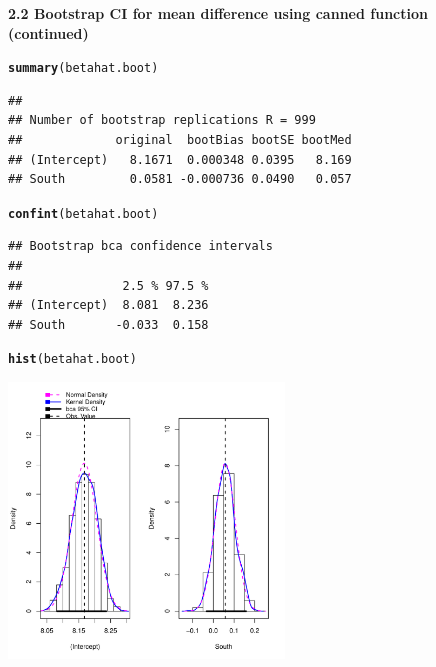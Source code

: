 \documentclass[10pt,handout]{beamer}\usepackage[]{graphicx}\usepackage[]{color}
\makeatletter
\newcommand{\hlstd}[1]{\textcolor[rgb]{0.345,0.345,0.345}{#1}}%
\newcommand{\hlkwd}[1]{\textcolor[rgb]{0.737,0.353,0.396}{\textbf{#1}}}%
\newenvironment{kframe}{%
 \def\at@end@of@kframe{}%
 \ifinner\ifhmode%
  \def\at@end@of@kframe{\end{minipage}}%
  \begin{minipage}{\columnwidth}%
 \fi\fi%
 \def\FrameCommand##1{\hskip\@totalleftmargin \hskip-\fboxsep
 \colorbox{shadecolor}{##1}\hskip-\fboxsep
     \hskip-\linewidth \hskip-\@totalleftmargin \hskip\columnwidth}%
 \MakeFramed {\advance\hsize-\width
   \@totalleftmargin\z@ \linewidth\hsize
   \@setminipage}}%
 {\par\unskip\endMakeFramed%
 \at@end@of@kframe}
\newenvironment{knitrout}{}{} %
\makeatother
\begin{document}
\begin{frame}[fragile,plain]
	\small
	\textbf{2.2 Bootstrap CI for mean difference using canned function (continued)}
\begin{knitrout}\tiny
{}\color{fgcolor}\begin{kframe}
\begin{alltt}
\hlkwd{summary}\hlstd{(betahat.boot)}
\end{alltt}
\begin{verbatim}
## 
## Number of bootstrap replications R = 999 
##             original  bootBias bootSE bootMed
## (Intercept)   8.1671  0.000348 0.0395   8.169
## South         0.0581 -0.000736 0.0490   0.057
\end{verbatim}
\begin{alltt}
\hlkwd{confint}\hlstd{(betahat.boot)}
\end{alltt}
\begin{verbatim}
## Bootstrap bca confidence intervals
## 
##              2.5 % 97.5 %
## (Intercept)  8.081  8.236
## South       -0.033  0.158
\end{verbatim}
\begin{alltt}
\hlkwd{hist}\hlstd{(betahat.boot)}
\end{alltt}
\end{kframe}

{\centering \includegraphics[width=0.55\textwidth]{figure/unnamed-chunk-43-1} 

}


\end{knitrout}
	
\end{frame}
\end{document}
